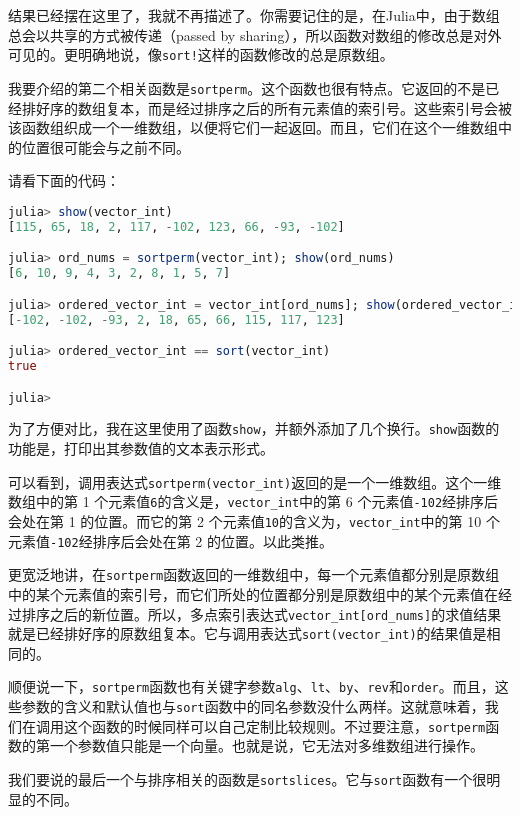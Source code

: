 结果已经摆在这里了，我就不再描述了。你需要记住的是，在Julia中，由于数组总会以共享的方式被传递（passed by sharing），所以函数对数组的修改总是对外可见的。更明确地说，像\verb`sort!`这样的函数修改的总是原数组。

我要介绍的第二个相关函数是\verb`sortperm`。这个函数也很有特点。它返回的不是已经排好序的数组复本，而是经过排序之后的所有元素值的索引号。这些索引号会被该函数组织成一个一维数组，以便将它们一起返回。而且，它们在这个一维数组中的位置很可能会与之前不同。

请看下面的代码：

\begin{lstlisting}[language=julia]
julia> show(vector_int)
[115, 65, 18, 2, 117, -102, 123, 66, -93, -102]

julia> ord_nums = sortperm(vector_int); show(ord_nums)
[6, 10, 9, 4, 3, 2, 8, 1, 5, 7]

julia> ordered_vector_int = vector_int[ord_nums]; show(ordered_vector_int)
[-102, -102, -93, 2, 18, 65, 66, 115, 117, 123]

julia> ordered_vector_int == sort(vector_int)
true

julia>
\end{lstlisting}

为了方便对比，我在这里使用了函数\verb`show`，并额外添加了几个换行。\verb`show`函数的功能是，打印出其参数值的文本表示形式。

可以看到，调用表达式\verb`sortperm(vector_int)`返回的是一个一维数组。这个一维数组中的第 1 个元素值\verb`6`的含义是，\verb`vector_int`中的第 6 个元素值\verb`-102`经排序后会处在第 1 的位置。而它的第 2 个元素值\verb`10`的含义为，\verb`vector_int`中的第 10 个元素值\verb`-102`经排序后会处在第 2 的位置。以此类推。

更宽泛地讲，在\verb`sortperm`函数返回的一维数组中，每一个元素值都分别是原数组中的某个元素值的索引号，而它们所处的位置都分别是原数组中的某个元素值在经过排序之后的新位置。所以，多点索引表达式\verb`vector_int[ord_nums]`的求值结果就是已经排好序的原数组复本。它与调用表达式\verb`sort(vector_int)`的结果值是相同的。

顺便说一下，\verb`sortperm`函数也有关键字参数\verb`alg`、\verb`lt`、\verb`by`、\verb`rev`和\verb`order`。而且，这些参数的含义和默认值也与\verb`sort`函数中的同名参数没什么两样。这就意味着，我们在调用这个函数的时候同样可以自己定制比较规则。不过要注意，\verb`sortperm`函数的第一个参数值只能是一个向量。也就是说，它无法对多维数组进行操作。

我们要说的最后一个与排序相关的函数是\verb`sortslices`。它与\verb`sort`函数有一个很明显的不同。

